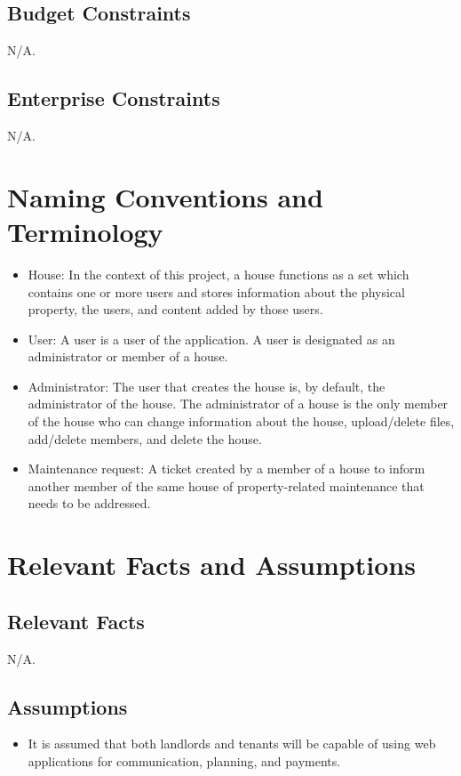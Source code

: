 \documentclass[12pt]{article}
\begin{document}
\subsection{Budget Constraints}
    N/A.
    
\subsection{Enterprise Constraints}
    N/A.

\section{Naming Conventions and Terminology}
    \begin{itemize}
    \item House: In the context of this project, a house functions as a set
      which contains one or more users and stores information about the
      physical property, the users, and content added by those users.
    \item User: A user is a user of the application. A user is designated as an administrator or member of a house.
    \item Administrator: The user that creates the house is, by default, the administrator of the house. The administrator of a house is the only member of the house who can change information about the house, upload/delete files, add/delete members, and delete the house.
    \item Maintenance request: A ticket created by a member of a house to inform another member of the same house of property-related maintenance that needs to be addressed.
    \end{itemize}

\section{Relevant Facts and Assumptions} 
\subsection{Relevant Facts}
N/A.
\subsection{Assumptions}
  \begin{itemize}
  \item  It is assumed that both landlords and tenants will be capable of using
    web applications for communication, planning, and payments.
  \end{itemize} 
\end{document}
